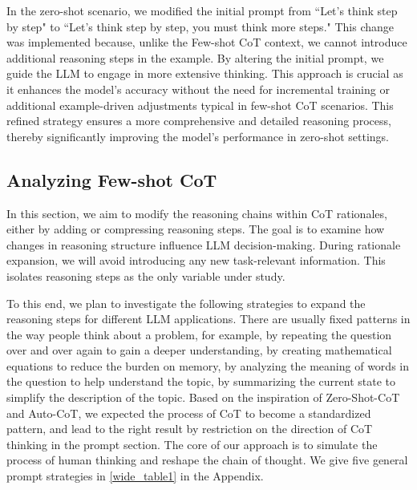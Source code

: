 \documentclass[11pt]{article}
\begin{document}
In the zero-shot scenario, we modified the initial prompt from ``Let's think step by step" to ``Let's think step by step, you must think more steps." This change was implemented because, unlike the Few-shot CoT context, we cannot introduce additional reasoning steps in the example. By altering the initial prompt, we guide the LLM to engage in more extensive thinking. This approach is crucial as it enhances the model's accuracy without the need for incremental training or additional example-driven adjustments typical in few-shot CoT scenarios. This refined strategy ensures a more comprehensive and detailed reasoning process, thereby significantly improving the model's performance in zero-shot settings.


\phantom{Invisible Text}
\vspace{-\baselineskip}

\subsection{Analyzing Few-shot CoT}

In this section, we aim to modify the reasoning chains within CoT rationales, either by adding or compressing reasoning steps. The goal is to examine how changes in reasoning structure influence LLM decision-making. During rationale expansion, we will avoid introducing any new task-relevant information. This isolates reasoning steps as the only variable under study.

To this end, we plan to investigate the following strategies to expand the reasoning steps for different LLM applications.
There are usually fixed patterns in the way people think about a problem, for example, by repeating the question over and over again to gain a deeper understanding, by creating mathematical equations to reduce the burden on memory, by analyzing the meaning of words in the question to help understand the topic, by summarizing the current state to simplify the description of the topic.
Based on the inspiration of Zero-Shot-CoT and Auto-CoT, we expected the process of CoT to become a standardized pattern, and lead to the right result by restriction on the direction of CoT thinking in the prompt section.
The core of our approach is to simulate the process of human thinking and reshape the chain of thought. We give five general prompt strategies in \autoref{wide_table1} in the Appendix.
\end{document}
